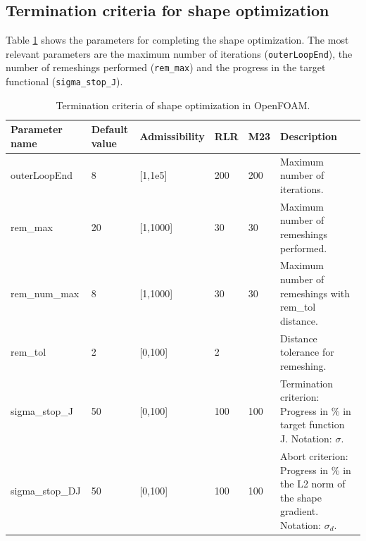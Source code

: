 \documentclass[oneside]{article}
\numberwithin{equation}{section}
\numberwithin{figure}{section}
\numberwithin{figure}{section}
\begin{document}
\subsection{Termination criteria for shape optimization}
Table \ref{tab:abbruch} shows the parameters for completing the shape optimization. The most relevant parameters are the maximum number of iterations (\texttt{outerLoopEnd}), the number of remeshings performed (\verb|rem_max|) and the progress in the target functional (\verb|sigma_stop_J|).
\begin{table}[h]
    \centering
    \begin{tabular}{|p{2.6cm}|p{1cm}|p{1.4cm}|p{0.7cm}|p{0.7cm}|p{4cm}|} %
        \hline
        \cellcolor{light-gray} Parameter name & \cellcolor{light-gray} Default value & \cellcolor{light-gray} Admissibility & \cellcolor{light-gray} RLR & \cellcolor{light-gray} M23 & \cellcolor{light-gray} Description\\
        \hline
        outerLoopEnd      &   8      & [1,1e5]   & 200   & 200 & Maximum number of iterations.\\
        \hline
        rem\_max          &   20     & [1,1000]  & 30    & 30 & Maximum number of remeshings performed.\\
        \hline
        rem\_num\_max     &   8      & [1,1000]  & 30    & 30 & Maximum number of remeshings with rem\_tol distance.\\
        \hline
        rem\_tol          &   2      & [0,100]   & 2     &    & Distance tolerance for remeshing.\\
        \hline
        sigma\_stop\_J    &   50     & [0,100]   & 100   & 100 & Termination criterion: Progress in \% in target function J. Notation: $\sigma$.\\
        \hline
        sigma\_stop\_DJ   &   50     & [0,100]   & 100   & 100 & Abort criterion: Progress in \% in the L2 norm of the shape gradient. Notation: $\sigma_d$.\\
        \hline
    \end{tabular}
    \caption{Termination criteria of shape optimization in OpenFOAM.}\label{tab:abbruch}
\end{table}
\end{document}
